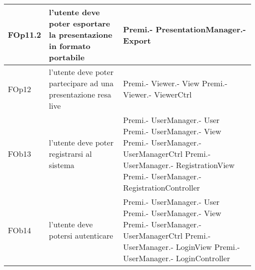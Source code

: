 \begin{longtable}{|l|p{5cm}|p{7cm}|}
\hline
FOp11.2 & l'utente deve poter esportare la presentazione in formato portabile & Premi.- \linebreak PresentationManager.- \linebreak Export \linebreak \\
\hline
FOp12 & l'utente deve poter partecipare ad una presentazione resa live & Premi.- \linebreak Viewer.- \linebreak View \linebreak Premi.- \linebreak Viewer.- \linebreak ViewerCtrl \linebreak \\
\hline
FOb13 & l'utente deve poter registrarsi al sistema & Premi.- \linebreak UserManager.- \linebreak User \linebreak Premi.- \linebreak UserManager.- \linebreak View \linebreak Premi.- \linebreak UserManager.- \linebreak UserManagerCtrl \linebreak Premi.- \linebreak UserManager.- \linebreak RegistrationView \linebreak Premi.- \linebreak UserManager.- \linebreak RegistrationController \linebreak \\
\hline
FOb14 & l'utente deve potersi autenticare & Premi.- \linebreak UserManager.- \linebreak User \linebreak Premi.- \linebreak UserManager.- \linebreak View \linebreak Premi.- \linebreak UserManager.- \linebreak UserManagerCtrl \linebreak Premi.- \linebreak UserManager.- \linebreak LoginView \linebreak Premi.- \linebreak UserManager.- \linebreak LoginController \linebreak \\

\end{longtable}
